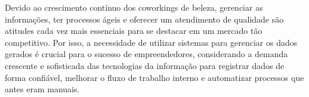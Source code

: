 Devido ao crescimento contínuo dos coworkings de beleza, gerenciar as informações, ter processos ágeis e oferecer um atendimento de qualidade são atitudes cada vez mais essenciais para se destacar em um mercado tão competitivo. Por isso, a necessidade de utilizar sistemas para gerenciar os dados gerados é crucial para o sucesso de empreendedores, considerando  a demanda crescente e sofisticada das tecnologias da informação para registrar dados de forma confiável, melhorar o fluxo de trabalho interno e automatizar processos que antes eram manuais.



	


